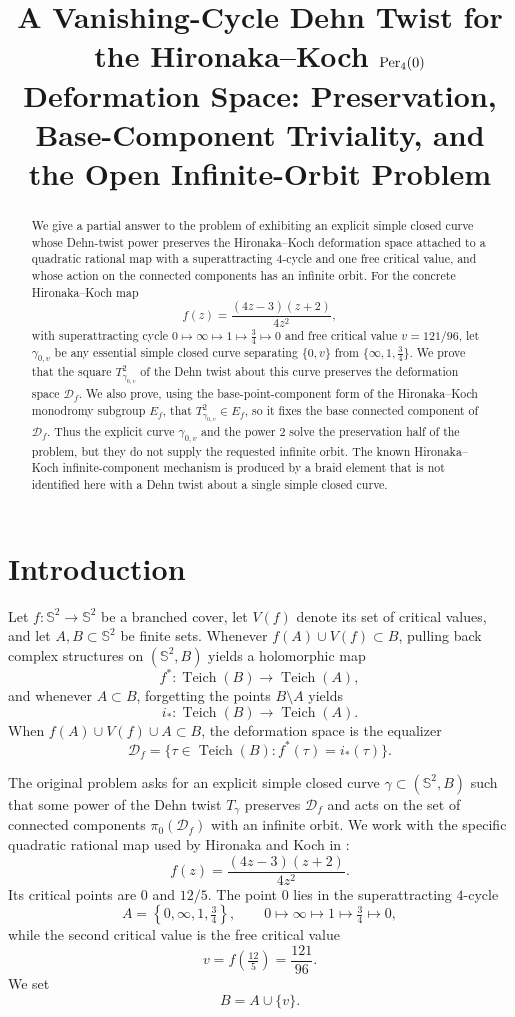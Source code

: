 \documentclass[12pt]{article}
\title{A Vanishing-Cycle Dehn Twist for the Hironaka--Koch
$\operatorname{Per}_4(0)$ Deformation Space: Preservation, Base-Component
Triviality, and the Open Infinite-Orbit Problem}
\author{}
\date{}
\theoremstyle{definition}
\theoremstyle{remark}
\numberwithin{equation}{section}
\newcommand{\Sph}{\mathbb S}
\newcommand{\Teich}{\operatorname{Teich}}
\newcommand{\Df}{\mathcal D_f}
\newcommand{\Ef}{E_f}
\begin{document}
\maketitle

\begin{abstract}
We give a partial answer to the problem of exhibiting an explicit simple
closed curve whose Dehn-twist power preserves the Hironaka--Koch
deformation space attached to a quadratic rational map with a
superattracting $4$-cycle and one free critical value, and whose action
on the connected components has an infinite orbit.  For the concrete
Hironaka--Koch map
\[
f(z)=\frac{(4z-3)(z+2)}{4z^{2}},
\]
with superattracting cycle
$0\mapsto\infty\mapsto1\mapsto\tfrac34\mapsto0$ and free critical value
$v=121/96$, let $\gamma_{0,v}$ be any essential simple closed curve
separating $\{0,v\}$ from $\{\infty,1,\tfrac34\}$.  We prove that the
square $T_{\gamma_{0,v}}^{2}$ of the Dehn twist about this curve
preserves the deformation space $\Df$.  We also prove, using the
base-point-component form of the Hironaka--Koch monodromy subgroup
$\Ef$, that $T_{\gamma_{0,v}}^{2}\in\Ef$, so it fixes the base
connected component of $\Df$.  Thus the explicit curve
$\gamma_{0,v}$ and the power $2$ solve the preservation half of the
problem, but they do not supply the requested infinite orbit.  The known
Hironaka--Koch infinite-component mechanism is produced by a braid
element that is not identified here with a Dehn twist about a single
simple closed curve.
\end{abstract}

\section{Introduction}
\label{sec:intro}

Let $f:\Sph^{2}\to\Sph^{2}$ be a branched cover, let $V(f)$ denote its
set of critical values, and let $A,B\subset\Sph^{2}$ be finite sets.
Whenever $f(A)\cup V(f)\subset B$, pulling back complex structures on
$(\Sph^{2},B)$ yields a holomorphic map
\[
f^{*}:\Teich(B)\longrightarrow\Teich(A),
\]
and whenever $A\subset B$, forgetting the points $B\setminus A$ yields
\[
i_{*}:\Teich(B)\longrightarrow\Teich(A).
\]
When $f(A)\cup V(f)\cup A\subset B$, the deformation space is the
equalizer
\[
\Df=\{\tau\in\Teich(B): f^{*}(\tau)=i_{*}(\tau)\}.
\]

The original problem asks for an explicit simple closed curve
$\gamma\subset(\Sph^{2},B)$ such that some power of the Dehn twist
$T_{\gamma}$ preserves $\Df$ and acts on the set of connected components
$\pi_{0}(\Df)$ with an infinite orbit.  We work with the specific
quadratic rational map used by Hironaka and Koch in \cite[\S4]{HK}:
\begin{equation}
\label{eq:HKmap}
f(z)=\frac{(4z-3)(z+2)}{4z^{2}}.
\end{equation}
Its critical points are $0$ and $12/5$.  The point $0$ lies in the
superattracting $4$-cycle
\[
A=\left\{0,\infty,1,\tfrac34\right\},\qquad
0\longmapsto\infty\longmapsto1\longmapsto\tfrac34\longmapsto0,
\]
while the second critical value is the free critical value
\[
v=f\!\left(\tfrac{12}{5}\right)=\frac{121}{96}.
\]
We set
\[
B=A\cup\{v\}.
\]
\end{document}
